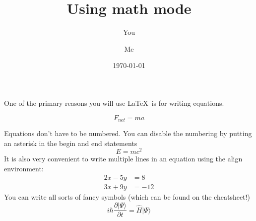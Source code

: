 \documentclass[a4paper]{article}
\begin{document}
\title{Using math mode}
\author{You \and Me}
\date{\today}
\maketitle

One of the primary reasons you will use \LaTeX \ is for writing equations.  

\begin{equation}
F_{net}=ma
\end{equation}

Equations don't have to be numbered. You can disable the numbering by putting an asterisk in the begin and end statements 
\begin{equation*}
E=mc^{2}
\end{equation*}
It is also very convenient to write multiple lines in an equation using the align environment:
\begin{align*}
2x - 5y &=  8 \\ 
3x + 9y &=  -12
\end{align*}
You can write all sorts of fancy symbols (which can be found on the cheatsheet!)
\begin{equation*}
i\hbar \frac{\partial | \Psi \rangle}{ \partial t}=\hat{H}|\Psi \rangle
\end{equation*}
\end{document}
